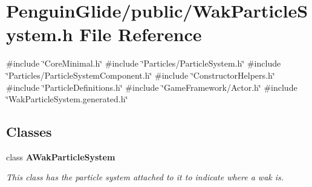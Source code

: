 \section{Penguin\+Glide/public/\+Wak\+Particle\+System.h File Reference}
\label{_wak_particle_system_8h}
{\ttfamily \#include \char`\"{}Core\+Minimal.\+h\char`\"{}}\newline
{\ttfamily \#include \char`\"{}Particles/\+Particle\+System.\+h\char`\"{}}\newline
{\ttfamily \#include \char`\"{}Particles/\+Particle\+System\+Component.\+h\char`\"{}}\newline
{\ttfamily \#include \char`\"{}Constructor\+Helpers.\+h\char`\"{}}\newline
{\ttfamily \#include \char`\"{}Particle\+Definitions.\+h\char`\"{}}\newline
{\ttfamily \#include \char`\"{}Game\+Framework/\+Actor.\+h\char`\"{}}\newline
{\ttfamily \#include \char`\"{}Wak\+Particle\+System.\+generated.\+h\char`\"{}}\newline
\subsection*{Classes}
\begin{DoxyCompactItemize}
\item 
class \textbf{ A\+Wak\+Particle\+System}
\begin{DoxyCompactList}\small\item\em This class has the particle system attached to it to indicate where a wak is. \end{DoxyCompactList}\end{DoxyCompactItemize}
